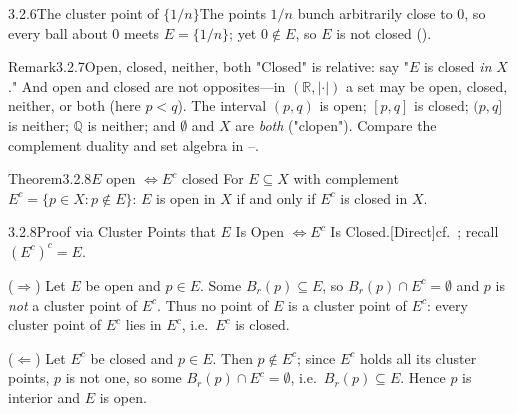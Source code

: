 \documentclass[main.tex]{subfiles}
\begin{document}
\begin{Fig}{3.2.6}{The cluster point of $\{1/n\}$}{The points $1/n$ bunch arbitrarily close to $0$, so every ball about $0$ meets $E=\{1/n\}$; yet $0\notin E$, so $E$ is not closed ().}
\end{Fig}

\begin{ObjL}{Remark}{3.2.7}{Open, closed, neither, both}
"Closed" is relative: say "$E$ is closed \emph{in} $X$." And open and closed are not opposites---in
$(\mathbb R,|\cdot|)$ a set may be open, closed, neither, or both (here $p<q$). The interval $(p,q)$ is open;
$[p,q]$ is closed; $(p,q]$ is neither; $\mathbb Q$ is neither; and $\emptyset$ and $X$ are
\emph{both} ("clopen"). Compare the complement duality and set algebra in --.
\end{ObjL}

\begin{Obj}{Theorem}{3.2.8}{$E$ open $\iff E^c$ closed}
For $E\subseteq X$ with complement $E^c=\{p\in X:p\notin E\}$: $E$ is open in $X$ if and only if
$E^c$ is closed in $X$.
\end{Obj}
\begin{Prf}{3.2.8}{Proof via Cluster Points that $E$ Is Open $\iff E^c$ Is Closed.}{[Direct]\quad cf.\ ; recall $(E^c)^c=E$.}
\item ($\Rightarrow$) Let $E$ be open and $p\in E$. Some $B_r(p)\subseteq E$, so $B_r(p)\cap E^c=
  \emptyset$ and $p$ is \emph{not} a cluster point of $E^c$. Thus no point of $E$ is a cluster point
  of $E^c$: every cluster point of $E^c$ lies in $E^c$, i.e.\ $E^c$ is closed.
\item ($\Leftarrow$) Let $E^c$ be closed and $p\in E$. Then $p\notin E^c$; since $E^c$ holds all its
  cluster points, $p$ is not one, so some $B_r(p)\cap E^c=\emptyset$, i.e.\ $B_r(p)\subseteq E$.
  Hence $p$ is interior and $E$ is open.
\end{Prf}
\end{document}
